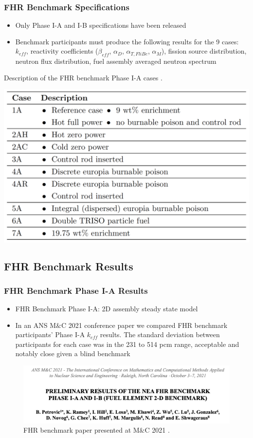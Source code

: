 \begin{frame}
    \frametitle{FHR Benchmark Specifications}
    \begin{itemize}
        \item Only Phase I-A and I-B specifications have been released 
        \item Benchmark participants must produce the following results for 
        the 9 cases: $k_{eff}$, reactivity coefficients ($\beta_{eff}$, 
        $\alpha_D$, $\alpha_{T, FliBe}$, $\alpha_M$), fission source distribution, 
        neutron flux distribution, fuel assembly averaged neutron spectrum
    \end{itemize}
    \vspace{-0.25cm}
    \begin{table}
        \caption{Description of the \acrlong{FHR} benchmark Phase I-A cases 
        \vspace{-0.25cm}
        \cite{noauthor_fluoride_nodate}.}
        \includegraphics[width=0.6\linewidth]{figures/benchmark-cases.png} 
    \end{table}
\end{frame}

\subsection{FHR Benchmark Results}
\begin{frame}
    \frametitle{FHR Benchmark Phase I-A Results}
    \begin{itemize}
        \item FHR Benchmark Phase I-A: 2D assembly steady state model
        \item In an ANS M$\&$C 2021 conference paper 
        we compared FHR benchmark participants' Phase I-A $k_{eff}$ results.  
        The standard deviation between participants for each case 
        was in the 231 to 514 pcm range, acceptable and notably close given a blind 
        benchmark
    \end{itemize}

    \begin{figure}[]
        \centering
        \includegraphics[width=0.85\linewidth]{figures/mnc.png} 
        \caption{FHR benchmark paper presented at M$\&$C 2021 
        \cite{petrovic_preliminary_2021}.}
    \end{figure}
\end{frame}

